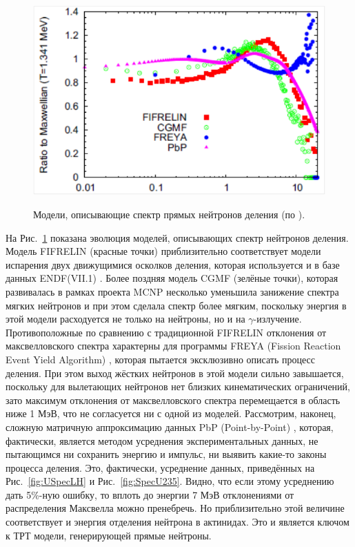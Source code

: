 \documentclass[a4paper,12pt]{article}
\begin{document}
\begin{large}
      \begin{figure}[ht]
    {
       \includegraphics[width=0.90\linewidth]{images/SpecModels}
    }
    \caption{Модели, описывающие спектр прямых нейтронов деления (по \cite{Capote16}).}
    \label{fig:SpecModels}
  \end{figure}
  На Рис.~\ref{fig:SpecModels} показана эволюция моделей, описывающих спектр нейтронов деления.
  Модель FIFRELIN (красные точки) приблизительно соответствует модели испарения двух движущимися осколков деления, которая используется и в базе данных ENDF(VII.1) \cite{ENDF/B-VII.1}.
  Более поздняя модель CGMF (зелёные точки), которая развивалась в рамках проекта MCNP \cite{MCNPX} несколько уменьшила занижение спектра мягких нейтронов и при этом сделала спектр более мягким, поскольку энергия в этой модели расходуется не только на нейтроны, но и на $\gamma$-излучение.
  Противоположные по сравнению с традиционной FIFRELIN отклонения от максвелловского спектра характерны для программы FREYA (Fission Reaction Event Yield Algorithm) \cite{FREYA1,FREYA2}, которая пытается эксклюзивно описать процесс деления.
  При этом выход жёстких нейтронов в этой модели сильно завышается, поскольку для вылетающих нейтронов нет близких кинематических ограничений, зато максимум отклонения от максвелловского спектра перемещается в область ниже 1 МэВ, что не согласуется ни с одной из моделей.
  Рассмотрим, наконец, сложную матричную аппроксимацию данных PbP (Point-by-Point) \cite{PbP}, которая, фактически, является методом усреднения экспериментальных данных, не пытающимся ни сохранить энергию и импульс, ни выявить какие-то законы процесса деления.
  Это, фактически, усреднение данных, приведённых на Рис.~\ref{fig:USpecLH} и Рис.~\ref{fig:SpecU235}.
  Видно, что если этому усреднению дать 5\%-ную ошибку, то вплоть до энергии 7 МэВ отклонениями от распределения Максвелла можно пренебречь.
  Но приблизительно этой величине соответствует и энергия отделения нейтрона в актинидах. Это и является ключом к ТРТ модели, генерирующей прямые нейтроны.
  

\end{large}
\end{document}
